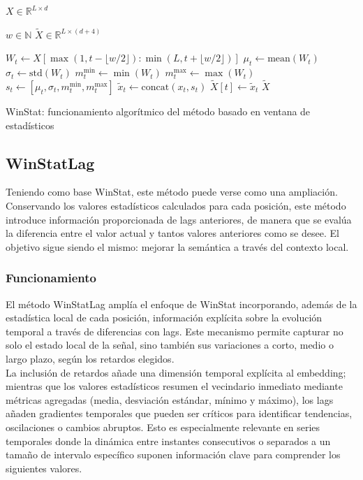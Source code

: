 \begin{algorithm}[H]
	\begin{algorithmic}[1]
		\Require 
		$X \in \mathbb{R}^{L \times d}$ 
		
		$w \in \mathbb{N}$ 
		\Ensure 
		$\tilde{X} \in \mathbb{R}^{L \times (d+4)}$
		
		\State $W_t \gets X[\max(1, t - \lfloor w/2 \rfloor) : \min(L, t + \lfloor w/2 \rfloor)]$
		\State $\mu_t \gets \text{mean}(W_t)$
		\State $\sigma_t \gets \text{std}(W_t)$
		\State $m^{\min}_t \gets \min(W_t)$
		\State $m^{\max}_t \gets \max(W_t)$
		\State $s_t \gets [\mu_t, \sigma_t, m^{\min}_t, m^{\max}_t]$
		\State $\tilde{x}_t \gets \text{concat}(x_t, s_t)$
		\State $\tilde{X}[t] \gets \tilde{x}_t$
		\EndFor
		\State \Return $\tilde{X}$
	\end{algorithmic}
	\caption{WinStat: funcionamiento algorítmico del método basado en ventana de estadísticos}
	\label{winstat}
\end{algorithm}

\subsection{WinStatLag}

Teniendo como base WinStat, este método puede verse como una ampliación. Conservando los valores estadísticos calculados para cada posición, este método introduce información proporcionada de lags anteriores, de manera que se evalúa la diferencia entre el valor actual y tantos valores anteriores como se desee. El objetivo sigue siendo el mismo: mejorar la semántica a través del contexto local.

\subsubsection{Funcionamiento}

El método WinStatLag amplía el enfoque de WinStat incorporando, además de la estadística local de cada posición, información explícita sobre la evolución temporal a través de diferencias con lags. Este mecanismo permite capturar no solo el estado local de la señal, sino también sus variaciones a corto, medio o largo plazo, según los retardos elegidos.\\

La inclusión de retardos añade una dimensión temporal explícita al embedding; mientras que los valores estadísticos resumen el vecindario inmediato mediante métricas agregadas (media, desviación estándar, mínimo y máximo), los lags añaden gradientes temporales que pueden ser críticos para identificar tendencias, oscilaciones o cambios abruptos. Esto es especialmente relevante en series temporales donde la dinámica entre instantes consecutivos  o separados a un tamaño de intervalo específico suponen información clave para comprender los siguientes valores.\\

